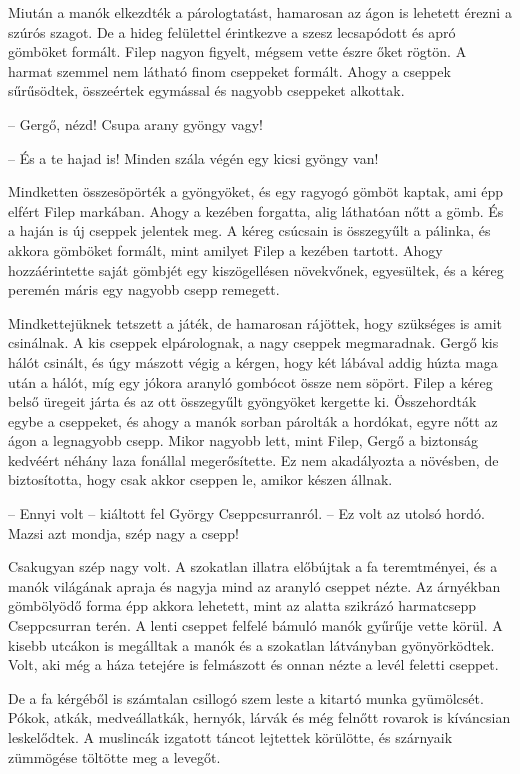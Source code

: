 \documentclass[10pt]{memoir}
\begin{document}
Miután a manók elkezdték a párologtatást, hamarosan az ágon is lehetett érezni
a szúrós szagot. De a hideg felülettel érintkezve a szesz lecsapódott és apró
gömböket formált. Filep nagyon figyelt, mégsem vette észre őket rögtön. A
harmat szemmel nem látható finom cseppeket formált. Ahogy a cseppek sűrűsödtek,
összeértek egymással és nagyobb cseppeket alkottak.

-- Gergő, nézd! Csupa arany gyöngy vagy!

-- És a te hajad is! Minden szála végén egy kicsi gyöngy van!

Mindketten összesöpörték a gyöngyöket, és egy ragyogó gömböt kaptak, ami épp
elfért Filep markában. Ahogy a kezében forgatta, alig láthatóan nőtt a gömb. És
a haján is új cseppek jelentek meg. A kéreg csúcsain is összegyűlt a pálinka,
és akkora gömböket formált, mint amilyet Filep a kezében tartott. Ahogy
hozzáérintette saját gömbjét egy kiszögellésen növekvőnek, egyesültek, és a
kéreg peremén máris egy nagyobb csepp remegett.

Mindkettejüknek tetszett a játék, de hamarosan rájöttek, hogy szükséges is amit
csinálnak. A kis cseppek elpárolognak, a nagy cseppek megmaradnak. Gergő kis
hálót csinált, és úgy mászott végig a kérgen, hogy két lábával addig húzta maga
után a hálót, míg egy jókora aranyló gombócot össze nem söpört. Filep a kéreg
belső üregeit járta és az ott összegyűlt gyöngyöket kergette ki. Összehordták
egybe a cseppeket, és ahogy a manók sorban párolták a hordókat, egyre nőtt az
ágon a legnagyobb csepp. Mikor nagyobb lett, mint Filep, Gergő a biztonság
kedvéért néhány laza fonállal megerősítette. Ez nem akadályozta a növésben, de
biztosította, hogy csak akkor cseppen le, amikor készen állnak.

-- Ennyi volt -- kiáltott fel György Cseppcsurranról. -- Ez volt az utolsó
hordó.  Mazsi azt mondja, szép nagy a csepp!

Csakugyan szép nagy volt. A szokatlan illatra előbújtak a fa teremtményei, és a
manók világának apraja és nagyja mind az aranyló cseppet nézte. Az árnyékban
gömbölyödő forma épp akkora lehetett, mint az alatta szikrázó harmatcsepp
Cseppcsurran terén. A lenti cseppet felfelé bámuló manók gyűrűje vette körül. A
kisebb utcákon is megálltak a manók és a szokatlan látványban gyönyörködtek.
Volt, aki még a háza tetejére is felmászott és onnan nézte a levél feletti
cseppet.

De a fa kérgéből is számtalan csillogó szem leste a kitartó munka gyümölcsét.
Pókok, atkák, medveállatkák, hernyók, lárvák és még felnőtt rovarok is
kíváncsian leskelődtek. A muslincák izgatott táncot lejtettek körülötte, és
szárnyaik zümmögése töltötte meg a levegőt.
\end{document}
